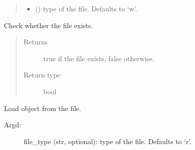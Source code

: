 \documentclass[letterpaper,10pt,english]{sphinxmanual}
\begin{document}
\begin{fulllineitems}
\begin{fulllineitems}
\begin{quote}
\begin{description}
\begin{itemize}
\item {} 
 (\sphinxstyleliteralemphasis{\sphinxupquote{, }}) \textendash{} type of the file. Defaults to ‘w’.

\end{itemize}

\end{description}\end{quote}

\end{fulllineitems}


\begin{fulllineitems}
\label{\detokenize{_modules/cosifer.handlers:cosifer.handlers.fs_handler.FileSystemHandler.exist}}
Check whether the file exists.
\begin{quote}\begin{description}
\item[{Returns}] \leavevmode
true if the file exists, false otherwise.

\item[{Return type}] \leavevmode
bool

\end{description}\end{quote}

\end{fulllineitems}


\begin{fulllineitems}
\end{fulllineitems}


\begin{fulllineitems}
\label{\detokenize{_modules/cosifer.handlers:cosifer.handlers.fs_handler.FileSystemHandler.load}}
Load object from the file.
\begin{description}
\item[{Argd:}] \leavevmode
file\_type (str, optional): type of the file. Defaults to ‘r’.


\end{description}
\end{fulllineitems}
\end{fulllineitems}
\end{document}
